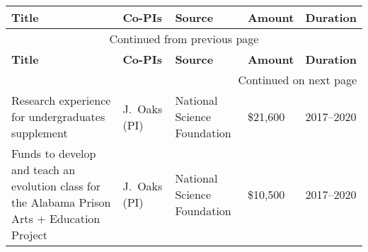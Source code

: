 \begin{longtable}[l]{ @{} p{2.5in} p{0.5in} p{1.5in} p{1.0in} p{0.8in} @{} }
    \hline
    \textbf{Title} & \textbf{Co-PIs} & \textbf{Source} & \textbf{Amount} & \textbf{Duration} \\
    \hline
    \endfirsthead
    \multicolumn{5}{c}{{Continued from previous page}} \\
    \hline
    \textbf{Title} & \textbf{Co-PIs} & \textbf{Source} & \textbf{Amount} & \textbf{Duration} \\
    \hline
    \endhead
    \hline \multicolumn{5}{r}{{Continued on next page}} \\
    \endfoot
    \hline
    \endlastfoot
    Research experience for undergraduates supplement & J.\ Oaks (PI) & National Science Foundation & \$21,600 & 2017--2020 \\
    Funds to develop and teach an evolution class for the Alabama Prison Arts + Education Project & J.\ Oaks (PI) & National Science Foundation & \$10,500 & 2017--2020 \\
\end{longtable}
